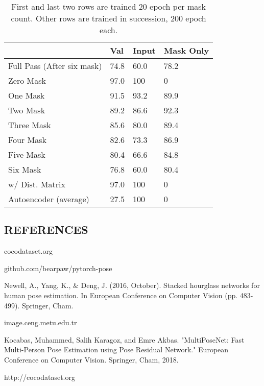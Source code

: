 \documentclass[titlepage, a4paper, 14pt]{extarticle} %
\begin{document}
\begin{table}[H]


\begin{tabular}{l|lll}
                & Val  & Input & Mask Only \\ \hline
Full Pass (After six mask)       &  74.8    &   60.0    &     78.2      \\
Zero Mask       & 97.0   & 100   & 0         \\
One Mask        & 91.5 & 93.2  & 89.9      \\
Two Mask        & 89.2 & 86.6  & 92.3      \\
Three Mask      & 85.6 & 80.0  & 89.4      \\
Four Mask       & 82.6 & 73.3  & 86.9      \\
Five Mask       & 80.4 & 66.6  & 84.8      \\
Six Mask        & 76.8 & 60.0  & 80.4      \\
w/ Dist. Matrix & 97.0   & 100   & 0         \\
Autoencoder (average)    & 27.5   & 100   & 0        
\end{tabular}
\caption{First and last two rows are trained 20 epoch per mask count. Other rows are trained in succession, 200 epoch each. }
\end{table}

\subsection{REFERENCES} \label{ref}

\begin{thebibliography}{999}

	cocodataset.org
	
	github.com/bearpaw/pytorch-pose
	
	Newell, A., Yang, K., \& Deng, J. (2016, October). Stacked hourglass networks for human pose estimation. In European Conference on Computer Vision (pp. 483-499). Springer, Cham.
	
	image.ceng.metu.edu.tr
	
	Kocabas, Muhammed, Salih Karagoz, and Emre Akbas. "MultiPoseNet: Fast Multi-Person Pose Estimation using Pose Residual Network." European Conference on Computer Vision. Springer, Cham, 2018.
	
	http://cocodataset.org
	
	

\end{thebibliography}
\end{document}
